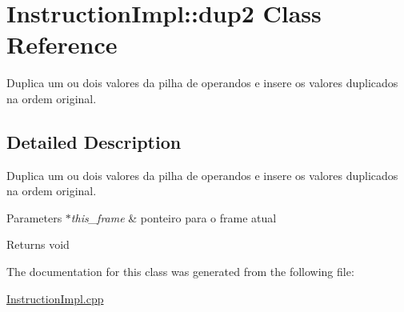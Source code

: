\hypertarget{class_instruction_impl_1_1dup2}{}\section{Instruction\+Impl\+:\+:dup2 Class Reference}
\label{class_instruction_impl_1_1dup2}


Duplica um ou dois valores da pilha de operandos e insere os valores duplicados na ordem original.  




\subsection{Detailed Description}
Duplica um ou dois valores da pilha de operandos e insere os valores duplicados na ordem original. 


\begin{DoxyParams}{Parameters}
{\em $\ast$this\+\_\+frame} & ponteiro para o frame atual \\
\hline
\end{DoxyParams}
\begin{DoxyReturn}{Returns}
void 
\end{DoxyReturn}


The documentation for this class was generated from the following file\+:\begin{DoxyCompactItemize}
\item 
\hyperlink{_instruction_impl_8cpp}{Instruction\+Impl.\+cpp}\end{DoxyCompactItemize}
